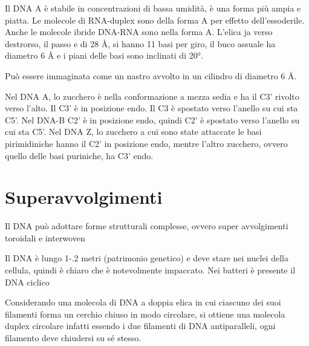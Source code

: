
Il DNA A è stabile in concentrazioni di bassa umidità, è una forma più ampia e piatta. Le molecole di RNA-duplex sono della forma A per effetto dell'essoderile. Anche le molecole ibride DNA-RNA sono nella forma A. L'elica ja verso destrorso, il passo e di 28 \AA, si hanno 11 basi per giro, il buco assuale ha diametro 6 \AA{} e i piani delle basi sono inclinati di 20°.

Può essere immaginata come un nastro avvolto in un cilindro di diametro 6 \AA.

Nel DNA A, lo zucchero è nella conformazione a mezza sedia e ha il C3' rivolto verso l'alto. Il C3' è in posizione endo. Il C3 è spostato verso l'anello su cui sta C5'. Nel DNA-B C2' è in posizione endo, quindi C2' è spostato verso l'anello su cui sta C5'. Nel DNA Z, lo zucchero a cui sono state attaccate le basi pirimidiniche hanno il C2' in posizione endo, mentre l'altro zucchero, ovvero quello delle basi puriniche, ha C3' endo.


\section{Superavvolgimenti}

Il DNA può adottare forme strutturali complesse, ovvero super avvolgimenti toroidali e interwoven


Il DNA è lungo 1-.2 metri (patrimonio genetico) e deve stare nei nuclei della cellula, quindi è chiaro che è notevolmente impaccato. Nei batteri è presente il DNA ciclico

Considerando una molecola di DNA a doppia elica in cui ciascuno dei suoi filamenti forma un cerchio chiuso in modo circolare, si ottiene una molecola duplex circolare infatti essendo i due filamenti di DNA antiparalleli, ogni filamento deve chiudersi su sé stesso.

